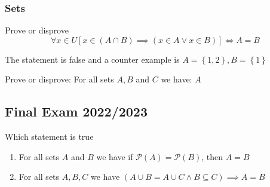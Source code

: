 \subsubsection{Sets}
\begin{exercise}
    Prove or disprove
    $$ \forall x \in U \left[x \in (A \cap B) \implies (x \in A \lor x \in B)\right] \iff A=B $$
\end{exercise}
The statement is false and a counter example is $A = \left\{1,2\right\}, B = \left\{1\right\}$

\begin{exercise}
    Prove or disprove:
    For all sets $A,B$ and $C$ we have: $A$
\end{exercise}


\subsection{Final Exam 2022/2023}
\begin{exercise}
    Which statement is true
    \begin{enumerate}
        \item For all sets $A$ and $B$ we have if $ \mathscr{P}(A) = \mathscr{P}(B) $, then $ A = B $
        \item For all sets $A,B,C$ we have $ (A \cup B = A \cup C \land B \subseteq C) \implies A = B $
    \end{enumerate}
\end{exercise}

